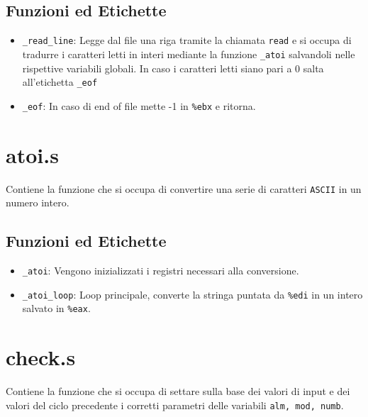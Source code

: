\documentclass[a4paper,11pt]{article}
\newcommand{\itemtt}[1]{\item \texttt{#1}}
\begin{document}
	\subsection{Funzioni ed Etichette}
	\begin{itemize}
		\itemtt{\_read\_line}: Legge dal file una riga tramite la chiamata \texttt{read} e si occupa di tradurre i caratteri letti in interi mediante la funzione \texttt{\_atoi} salvandoli nelle rispettive variabili globali. In caso i caratteri letti siano pari a 0 salta all'etichetta \texttt{\_eof} 
		\itemtt{\_eof}: In caso di end of file mette -1 in \texttt{\%ebx} e ritorna.
	\end{itemize}
	
	\section{atoi.s}
	Contiene la funzione che si occupa di convertire una serie di caratteri \texttt{ASCII} in un numero intero. 
	\subsection{Funzioni ed Etichette}
	\begin{itemize}
		\itemtt{\_atoi}: Vengono inizializzati i registri necessari alla conversione.
		\itemtt{\_atoi\_loop}: Loop principale, converte la stringa puntata da \texttt{\%edi} in un intero salvato in \texttt{\%eax}. 
	\end{itemize}
	
	\section{check.s}
	Contiene la funzione che si occupa di settare sulla base dei valori di input e dei valori del ciclo precedente i corretti parametri delle variabili \texttt{alm, mod, numb}. 
\end{document}
